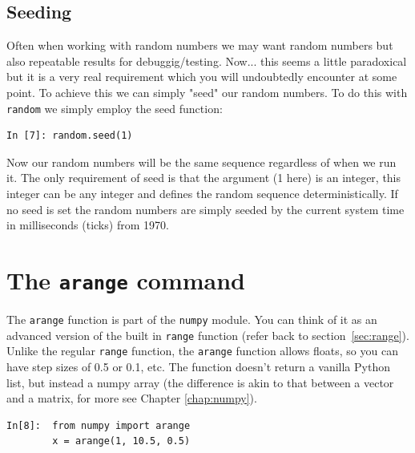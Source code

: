 \begin{tcolorbox}[colback=red!5!white,colframe=red!75!black]
\subsection{Seeding}
Often when working with random numbers we may want random numbers but also repeatable results for debuggig/testing. Now... this seems a little paradoxical but it is a very real requirement which you will undoubtedly encounter at some point. To achieve this we can simply "seed" our random numbers. To do this with \texttt{random} we simply employ the seed function:

\begin{lstlisting}[style=PY]
In [7]: random.seed(1)
\end{lstlisting}

Now our random numbers will be the same sequence regardless of when we run it. The only requirement of seed is that the argument (1 here) is an integer, this integer can be any integer and defines the random sequence deterministically. If no seed is set the random numbers are simply seeded by the current system time in milliseconds (ticks) from 1970.
\end{tcolorbox}

\section{The {\tt arange} command}

The \texttt{arange} function is part of the {\tt numpy} module. You can think of it as an advanced version of the built in \texttt{range} function (refer back to section~\ref{sec:range}). Unlike the regular \texttt{range} function, the \texttt{arange} function allows floats, so you can have step sizes of 0.5 or 0.1, etc. The function doesn't return a vanilla Python list, but instead a numpy array (the difference is akin to that between a vector and a matrix, for more see Chapter \ref{chap:numpy}).
\begin{lstlisting}[style=PY]
In[8]:  from numpy import arange
        x = arange(1, 10.5, 0.5)
\end{lstlisting}

